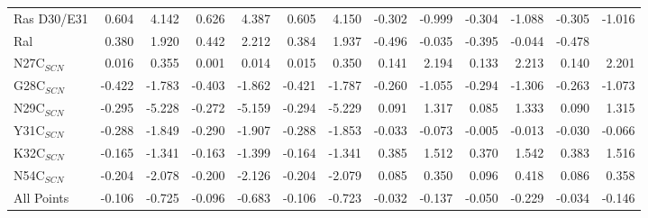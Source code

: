 \documentclass[landscape]{article}
\begin{document}
{\begin{tabular}{ l || r r | r r | r r | r r| r r | r r}
Ras D30/E31    & 0.604          & 4.142          & 0.626          & 4.387          & 0.605          & 4.150          & -0.302         & -0.999         & -0.304         & -1.088         & -0.305         & -1.016        \\
Ral            & 0.380          & 1.920          & 0.442          & 2.212          & 0.384          & 1.937          & -0.496         & -0.035         & -0.395         & -0.044         & -0.478        \\
\hline	
N27C$_{SCN}$   & 0.016          & 0.355          & 0.001          & 0.014          & 0.015          & 0.350          & 0.141          & 2.194          & 0.133          & 2.213          & 0.140          & 2.201         \\
G28C$_{SCN}$   & -0.422         & -1.783         & -0.403         & -1.862         & -0.421         & -1.787         & -0.260         & -1.055         & -0.294         & -1.306         & -0.263         & -1.073        \\
N29C$_{SCN}$   & -0.295         & -5.228         & -0.272         & -5.159         & -0.294         & -5.229         & 0.091          & 1.317          & 0.085          & 1.333          & 0.090          & 1.315         \\
Y31C$_{SCN}$   & -0.288         & -1.849         & -0.290         & -1.907         & -0.288         & -1.853         & -0.033         & -0.073         & -0.005         & -0.013         & -0.030         & -0.066        \\
K32C$_{SCN}$   & -0.165         & -1.341         & -0.163         & -1.399         & -0.164         & -1.341         & 0.385          & 1.512          & 0.370          & 1.542          & 0.383          & 1.516         \\
N54C$_{SCN}$   & -0.204         & -2.078         & -0.200         & -2.126         & -0.204         & -2.079         & 0.085          & 0.350          & 0.096          & 0.418          & 0.086          & 0.358         \\
\hline	
All Points     & -0.106         & -0.725         & -0.096         & -0.683         & -0.106         & -0.723         & -0.032         & -0.137         & -0.050         & -0.229         & -0.034         & -0.146        \\
\end{tabular}\\
}\\
\end{document}
